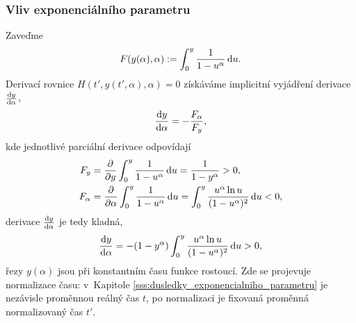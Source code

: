 \subsubsection{Vliv exponenciálního parametru}\label{sss:vliv_exponencialniho_parametru}
Zaveďme
\begin{equation}
    F(y(\alpha),\alpha):=\int_0^y\frac{1}{1-u^\alpha}\,\mathrm{d}{u}.
\end{equation}
Derivací rovnice $H(t',y(t',\alpha),\alpha)=0$ získáváme implicitní vyjádření derivace $\frac{\mathrm{d} y}{\mathrm{d} \alpha}$,
\begin{equation}
    \frac{\mathrm{d} y}{\mathrm{d} \alpha}=-\frac{F_\alpha}{F_y},
\end{equation}
kde jednotlivé parciální derivace odpovídají
\begin{align}
    F_y&=\frac{\partial }{\partial y}\int_0^y\frac{1}{1-u^\alpha}\,\mathrm{d}{u}=\frac{1}{1-y^{\alpha}}>0,\\
    F_\alpha&=\frac{\partial }{\partial \alpha}\int_0^y\frac{1}{1-u^\alpha}\,\mathrm{d}{u}=\int_0^y \frac{u^\alpha \ln{u}}{(1-u^\alpha)^2}\,\mathrm{d}{u}<0,
\end{align}
derivace $\frac{\mathrm{d} y}{\mathrm{d} \alpha}$ je tedy kladná,
\begin{equation}
    \frac{\mathrm{d} y}{\mathrm{d} \alpha}=-(1-y^\alpha)\int_0^y \frac{u^\alpha \ln{u}}{(1-u^\alpha)^2}\,\mathrm{d}{u}>0,
\end{equation}
řezy $y(\alpha)$ jsou při konstantním času funkce rostoucí. Zde se projevuje normalizace času: v~Kapitole \ref{sss:dusledky_exponencialniho_parametru} je nezávisle proměnnou reálný čas $t$, po normalizaci je fixovaná proměnná normalizovaný čas $t'$. 

